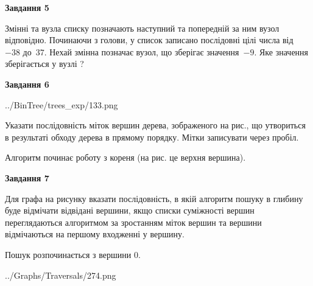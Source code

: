 \documentclass[12pt, ukrainian]{article}
\begin{document}
{\begin {large}
{\begin {center}\textbf{Завдання 5}\end {center}}\par
Змінні  та  вузла списку позначають наступний та попередній за ним вузол відповідно. Починаючи з голови, у список записано послідовні цілі числа від~$-38$ до~$37$. Нехай змінна  позначає вузол, що зберігає значення~$-9$.
Яке значення зберігається у вузлі  ?\par
\newpage

{\begin {center}\textbf{Завдання 6}\end {center}}\par

\begin{center}
	{../BinTree/trees_exp/133.png}
\end{center}
Указати послідовність міток вершин дерева, зображеного на рис., що утвориться в результаті обходу дерева в прямому порядку. Мітки записувати через пробіл.\par Алгоритм починає роботу з кореня (на рис. це верхня вершина).\par
\newpage

{\begin {center}\textbf{Завдання 7}\end {center}}\par
Для графа на рисунку вказати послідовність, в якій алгоритм пошуку в глибину буде відмічати відвідані вершини, якщо списки суміжності вершин переглядаються алгоритмом за зростанням міток вершин та вершини відмічаються на першому вход\-женні у вершину.\par
Пошук розпочинається з вершини 0.\par

\begin{center}
	{../Graphs/Traversals/274.png}
\end{center}\par
\newpage


\end{large}}
\end{document}
